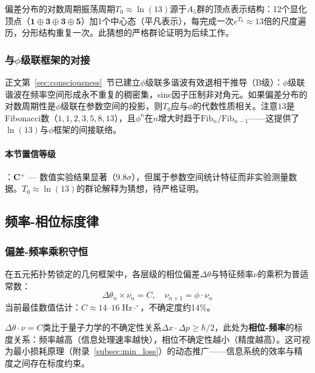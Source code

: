 \begin{conjecture}[$\ln(13)$周期猜想]
\label{conj:ln13}
偏差分布的对数周期振荡周期$T_0 \approx \ln(13)$源于$A_5$群的顶点表示结构：12个显化顶点（$\mathbf{1}\oplus\mathbf{3}\oplus\mathbf{3}\oplus\mathbf{5}$）加1个中心态（平凡表示），每完成一次$e^{T_0}\approx 13$倍的尺度遍历，分形结构重复一次。此猜想的严格群论证明为后续工作。
\end{conjecture}

\subsubsection{与$\phi$级联框架的对接}

正文第~\ref{sec:consciousness}~节已建立$\phi$级联多谐波有效退相干推导（B级）：$\phi$级联谐波在频率空间形成永不重复的稠密集，sinc因子压制非对角元。如果偏差分布的对数周期性是$\phi$级联在参数空间的投影，则$T_0$应与$\phi$的代数性质相关。注意$13$是Fibonacci数（$1,1,2,3,5,8,13$），且$\phi^n$在$n$增大时趋于$\text{Fib}_n/\text{Fib}_{n-1}$——这提供了$\ln(13)$与$\phi$框架的间接联络。

\paragraph{本节置信等级}：\textbf{C$^+$} --- 数值实验结果显著（9.8$\sigma$），但属于参数空间统计特征而非实验测量数据。$T_0 \approx \ln(13)$的群论解释为猜想，待严格证明。

\subsection{频率-相位标度律}
\label{subsec:freq_phase}

\subsubsection{偏差-频率乘积守恒}

\begin{conjecture}[频率-相位不确定性乘积守恒]
\label{conj:product_conservation}
在五元拓扑势锁定的几何框架中，各层级的相位偏差$\Delta\theta$与特征频率$\nu$的乘积为普适常数：
\begin{equation}
\Delta\theta_n \times \nu_n = C, \quad \nu_{n+1} = \phi \cdot \nu_n
\label{eq:product_conservation}
\end{equation}
当前最佳数值估计：$C \approx 14$--$16\;\text{Hz}\cdot^\circ$，不确定度约14\%。
\end{conjecture}

\begin{remark}[乘积守恒的物理类比]
$\Delta\theta \cdot \nu = C$类比于量子力学的不确定性关系$\Delta x \cdot \Delta p \geq \hbar/2$，此处为\textbf{相位-频率}的标度关系：频率越高（信息处理速率越快），相位不确定性越小（精度越高）。这可视为最小损耗原理（附录~\ref{subsec:min_loss}）的动态推广——信息系统的效率与精度之间存在标度约束。
\end{remark}

